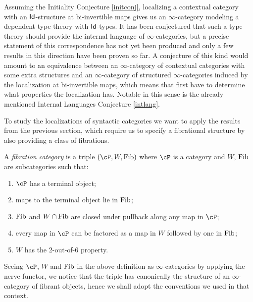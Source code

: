 \begin{rmk}
  Assuming the Initiality Conjecture \ref{initconj}, localizing a contextual
  category with an
  $\operatorname{\mathsf{Id}}$-structure at bi-invertible maps gives us an $\infty$-category modeling a
  dependent type theory with $\operatorname{\mathsf{Id}}$-types. It has been conjectured that such a
  type theory should provide the internal language of $\infty$-categories, but a
  precise statement of this correspondence has not yet been produced and only a
  few results in this direction have been proven so far. A conjecture of this kind
  would amount to an equivalence between an $\infty$-category of contextual
  categories with some extra structures and an $\infty$-category of structured
  $\infty$-categories induced by the localization at bi-invertible maps, which
  means that first have to determine what properties the localization has.
  Notable in this sense is the already mentioned Internal Languages Conjecture
  \ref{intlang}.
\end{rmk}

\noindent
To study the localizations of syntactic categories we want to apply
the results from the previous section, which require us to specify a
fibrational structure by also providing a class
of fibrations.

\begin{defn}\label{fibcats}
  A \emph{fibration category} is a triple $(\cP,W,\fib)$ where $\cP$ is a
  category and $W$, $\operatorname{Fib}$ are subcategories such that:
  \begin{enumerate}
    \item $\cP$ has a terminal object;
    \item maps to the terminal object lie in $\operatorname{Fib}$;
    \item $\operatorname{Fib}$ and $W\cap \operatorname{Fib}$ are closed under pullback along any map in $\cP$;
    \item every map in $\cP$ can be factored as a map in $W$ followed by one in
      $\operatorname{Fib}$;
    \item $W$ has the 2-out-of-6 property.
  \end{enumerate}
\end{defn}

\begin{rmk}
  Seeing $\cP$, $W$ and $\operatorname{Fib}$ in the above definition as $\infty$-categories by
  applying the nerve functor, we
  notice that the triple has canonically the structure of an $\infty$-category
  of fibrant objects, hence we shall adopt the conventions we used in that
  context.
\end{rmk}

